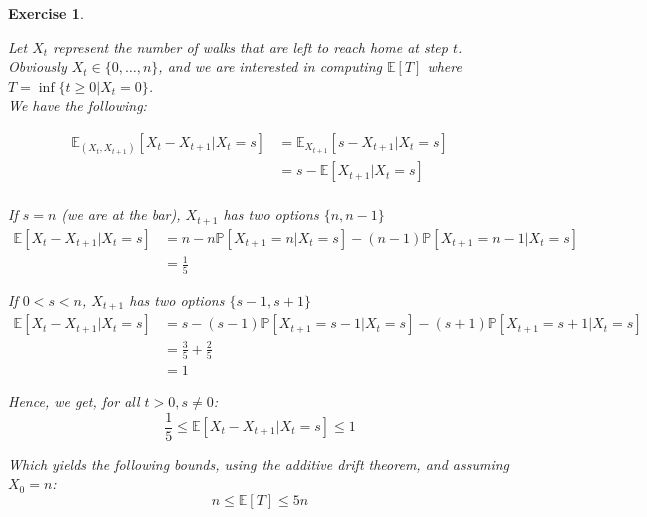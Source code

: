 \documentclass{article}
\newtheorem{exo}{Exercise}
\def\P{\mathbb{P}}
\def\E{\mathbb{E}}
\begin{document}
\begin{exo}{\ \\}

Let $X_t$ represent the number of walks that are left to reach home at step $t$. Obviously $X_t \in \{0, \dots, n\}$, and we are interested in computing $\E[T]$ where $T = \inf\{t \geq 0 | X_t = 0 \}$. \\

We have the following:

\begin{align*}
    \E_{(X_t,X_{t+1})}[X_t - X_{t+1}| X_t=s]  
    &= \E_{X_{t+1}}[s- X_{t+1}| X_t=s]  \\
    &= s - \E[X_{t+1}| X_t=s]  \\
\end{align*}

If $s=n$ (we are at the bar), $X_{t+1}$ has two options $\{n, n-1\}$
\begin{align*}
    \E[X_t-X_{t+1} | X_t = s] 
    &= n - n\P[X_{t+1}= n|X_t=s] - (n-1)\P[X_{t+1}=n-1|X_t=s] \\
    &= \frac{1}{5}
\end{align*}


If $0<s<n$, $X_{t+1}$ has two options $\{s-1, s+1\}$
\begin{align*}
    \E[X_t-X_{t+1} | X_t = s] 
    &= s - (s-1)\P[X_{t+1}= s-1|X_t=s] - (s+1)\P[X_{t+1}=s+1|X_t=s] \\
    &= \frac{3}{5} + \frac{2}{5} \\
    &= 1
\end{align*}

Hence, we get, for all $t>0, s \neq 0$:
\[ \frac{1}{5} \leq \E[X_t-X_{t+1} | X_t = s]  \leq 1 \]

Which yields the following bounds, using the additive drift theorem, and assuming $X_0 = n$:
\[ n \leq \E[T] \leq 5n \]
\end{exo}
\end{document}
